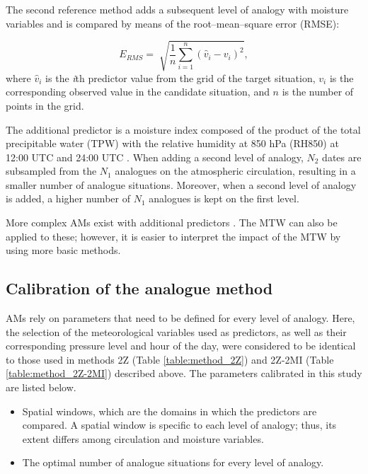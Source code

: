 \documentclass[hess, manuscript]{copernicus}
\begin{document}
	The second reference method \citep[2Z-2MI, Table \ref{table:method_2Z-2MI};][]{Bontron2005} adds a subsequent level of analogy with moisture variables and is compared by means of the root--mean--square error (RMSE):
	
	\begin{equation}
	\label{eq:RMSE}
	E_{RMS}= \sqrt[]{ \frac{1}{n} \sum_{i=1}^{n}(\hat{v}_{i} - v_{i})^{2}} ,
	\end{equation}
	where $\hat{v}_{i}$ is the \textit{i}th predictor value from the grid of the target situation, $v_{i}$ is the corresponding observed value in the candidate situation, and $n$ is the number of points in the grid.
	
	The additional predictor is a moisture index composed of the product of the total precipitable water (TPW) with the relative humidity at 850 hPa (RH850) at 12:00 UTC and 24:00 UTC \citep{Bontron2004}. When adding a second level of analogy, $N_{2}$ dates are subsampled from the $N_{1}$ analogues on the atmospheric circulation, resulting in a smaller number of analogue situations. Moreover, when a second level of analogy is added, a higher number of $N_{1}$ analogues is kept on the first level.
	
	More complex AMs exist with additional predictors \citep[e.g.][]{Horton2012a, BenDaoud2016, Caillouet2016}. The MTW can also be applied to these; however, it is easier to interpret the impact of the MTW by using more basic methods.
	
	
	\subsection{Calibration of the analogue method}
	\label{sec:calibration}
	
	AMs rely on parameters that need to be defined for every level of analogy. Here, the selection of the meteorological variables used as predictors, as well as their corresponding pressure level and hour of the day, were considered to be identical to those used in methods 2Z (Table \ref{table:method_2Z}) and 2Z-2MI (Table \ref{table:method_2Z-2MI}) described above. The parameters calibrated in this study are listed below.
	
	\begin{itemize}
		\item Spatial windows, which are the domains in which the predictors are compared. A spatial window is specific to each level of analogy; thus, its extent differs among circulation and moisture variables.
		\item The optimal number of analogue situations for every level of analogy.
	\end{itemize}
	
\end{document}
